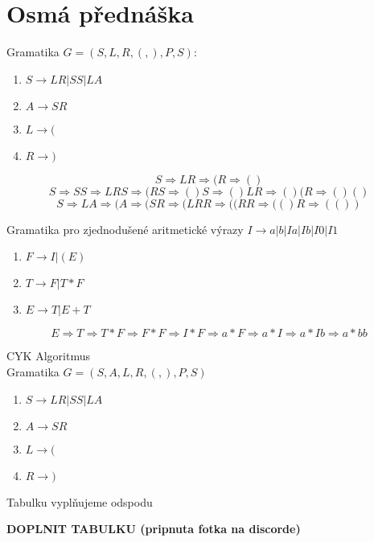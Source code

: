 \documentclass[../main.tex]{subfiles}
\begin{document}
\section{Osmá přednáška}

\begin{example}
    Gramatika $G = ({S,L,R}, {(,)},P,S)$:
    \begin{enumerate}
        \item $S \rightarrow LR|SS|LA$
        \item $A \rightarrow SR$
        \item $L \rightarrow ($
        \item $R \rightarrow )$
    \end{enumerate}
    \[S \Rightarrow LR \Rightarrow (R \Rightarrow()\]
    \[S \Rightarrow SS \Rightarrow LRS \Rightarrow (RS \Rightarrow ()S \Rightarrow ()LR \Rightarrow ()(R \Rightarrow ()()\]
    \[S \Rightarrow LA \Rightarrow (A \Rightarrow (SR \Rightarrow (LRR \Rightarrow ((RR \Rightarrow (()R \Rightarrow (())\]
\end{example}

\begin{example}
    Gramatika pro zjednodušené aritmetické výrazy $I \rightarrow a|b|Ia|Ib|I0|I1$
    \begin{enumerate}
        \item $F \rightarrow I|(E)$
        \item $T \rightarrow F|T \ast F$
        \item $E \rightarrow T|E + T$
    \end{enumerate}
    \[E \Rightarrow T \Rightarrow T \ast F \Rightarrow F \ast F \Rightarrow I \ast F \Rightarrow a\ast F \Rightarrow a\ast I \Rightarrow a\ast Ib \Rightarrow a\ast bb \]
\end{example}

\begin{example}
    CYK Algoritmus\\

    Gramatika $G = ({S,A,L,R}, {(,)}, P,S)$
    \begin{enumerate}
        \item $S \rightarrow LR|SS|LA$
        \item $A \rightarrow SR$
        \item $L \rightarrow ($
        \item $R \rightarrow )$
    \end{enumerate}
    Tabulku vyplňujeme odspodu

    \textbf{DOPLNIT TABULKU (pripnuta fotka na discorde)}
\end{example}
\end{document}
